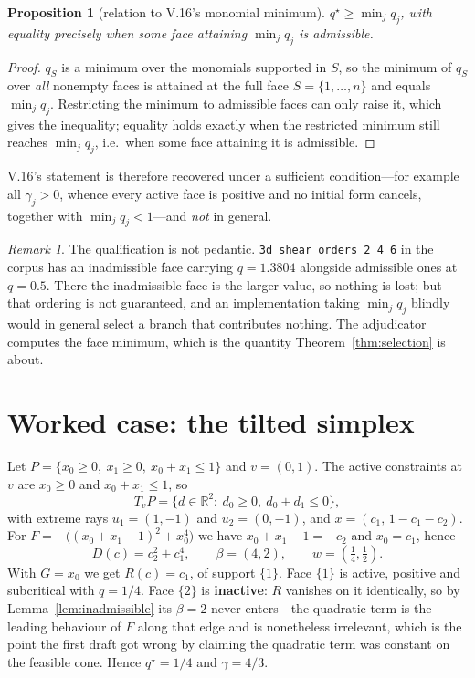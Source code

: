 \documentclass[11pt]{article}
\newtheorem{proposition}[theorem]{Proposition}
\theoremstyle{definition}
\theoremstyle{remark}
\newtheorem{remark}{Remark}
\newcommand{\R}{\mathbb{R}}
\begin{document}
\begin{proposition}[relation to V.16's monomial minimum]\label{prop:v16}
$q^\star\ge\min_j q_j$, with equality precisely when some face attaining
$\min_j q_j$ is admissible.
\end{proposition}

\begin{proof}
$q_S$ is a minimum over the monomials supported in $S$, so the minimum of
$q_S$ over \emph{all} nonempty faces is attained at the full face
$S=\{1,\dots,n\}$ and equals $\min_j q_j$. Restricting the minimum to
admissible faces can only raise it, which gives the inequality; equality holds
exactly when the restricted minimum still reaches $\min_j q_j$, i.e.\ when
some face attaining it is admissible.
\end{proof}

V.16's statement is therefore recovered under a sufficient condition---for
example all $\gamma_j>0$, whence every active face is positive and no initial
form cancels, together with $\min_j q_j<1$---and \emph{not} in general.

\begin{remark}
The qualification is not pedantic. \texttt{3d\_shear\_orders\_2\_4\_6} in the
corpus has an inadmissible face carrying $q=1.3804$ alongside admissible ones
at $q=0.5$. There the inadmissible face is the larger value, so nothing is
lost; but that ordering is not guaranteed, and an implementation taking
$\min_jq_j$ blindly would in general select a branch that contributes nothing.
The adjudicator computes the face minimum, which is the quantity
Theorem~\ref{thm:selection} is about.
\end{remark}

\section{Worked case: the tilted simplex}

Let $P=\{x_0\ge0,\ x_1\ge0,\ x_0+x_1\le1\}$ and $v=(0,1)$. The active
constraints at $v$ are $x_0\ge0$ and $x_0+x_1\le1$, so
\[
  T_vP=\{d\in\R^2:\ d_0\ge0,\ d_0+d_1\le0\},
\]
with extreme rays $u_1=(1,-1)$ and $u_2=(0,-1)$, and
$x=(c_1,\,1-c_1-c_2)$. For $F=-\bigl((x_0+x_1-1)^2+x_0^4\bigr)$ we have
$x_0+x_1-1=-c_2$ and $x_0=c_1$, hence
\[
  D(c)=c_2^2+c_1^4,\qquad \beta=(4,2),\qquad w=(\tfrac14,\tfrac12).
\]
With $G=x_0$ we get $R(c)=c_1$, of support $\{1\}$. Face $\{1\}$ is active,
positive and subcritical with $q=1/4$. Face $\{2\}$ is \textbf{inactive}: $R$
vanishes on it identically, so by Lemma~\ref{lem:inadmissible} its $\beta=2$
never enters---the quadratic term is the leading behaviour of $F$ along that
edge and is nonetheless irrelevant, which is the point the first draft got
wrong by claiming the quadratic term was constant on the feasible cone. Hence
$q^\star=1/4$ and $\gamma=4/3$.
\end{document}
